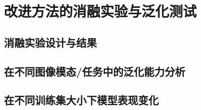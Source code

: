 \section{改进方法的消融实验与泛化测试}

\subsection{消融实验设计与结果}


\subsection{在不同图像模态/任务中的泛化能力分析}


\subsection{在不同训练集大小下模型表现变化}
